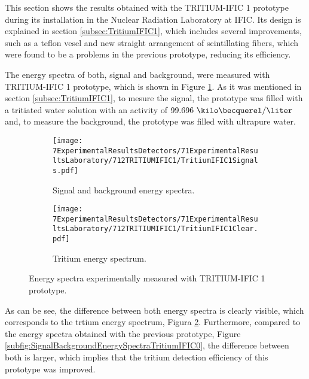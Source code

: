 This section shows the results obtained with the TRITIUM-IFIC 1 prototype  during its installation in the Nuclear Radiation Laboratory at IFIC. Its design is explained in section \ref{subsec:TritiumIFIC1}, which includes several improvements, such as a teflon vesel and new straight arrangement of scintillating fibers, which were found to be a problems in the previous prototype, reducing its efficiency.

The energy spectra of both, signal and background, were measured with TRITIUM-IFIC 1 prototype, which is shown in Figure \ref{subfig:SignalBackgroundEnergySpectraTritiumIFIC1}. As it was mentioned in section \ref{subsec:TritiumIFIC1}, to mesure the signal, the prototype was filled with a tritiated water solution with an activity of $99.696~\kilo\becquerel/\liter$ and, to measure the background, the prototype was filled with ultrapure water.

\begin{figure}
\centering
    \begin{subfigure}[b]{0.73\textwidth}
    \centering
    \texttt{[image: 7ExperimentalResultsDetectors/71ExperimentalResultsLaboratory/712TRITIUMIFIC1/TritiumIFIC1Signals.pdf]}  
    \caption{Signal and background energy spectra.\label{subfig:SignalBackgroundEnergySpectraTritiumIFIC1}}
    \end{subfigure}
    \hfill
    \begin{subfigure}[b]{0.73\textwidth}
    \centering
    \texttt{[image: 7ExperimentalResultsDetectors/71ExperimentalResultsLaboratory/712TRITIUMIFIC1/TritiumIFIC1Clear.pdf]}  
    \caption{Tritium energy spectrum.\label{subfig:TritiumEnergySpectraTritiumIFIC1}}
    \end{subfigure}
 \caption{Energy spectra experimentally measured with TRITIUM-IFIC 1 prototype.}
 \label{fig:EnergySpectraTRITIUMIFIC1}
\end{figure}


As can be see, the difference between both energy spectra is clearly visible, which corresponds to the trtium energy spectrum, Figura \ref{subfig:TritiumEnergySpectraTritiumIFIC1}. Furthermore, compared to the energy spectra obtained with the previous prototype, Figure \ref{subfig:SignalBackgroundEnergySpectraTritiumIFIC0}, the difference between both is larger, which implies that the tritium detection efficiency of this prototype was improved.

